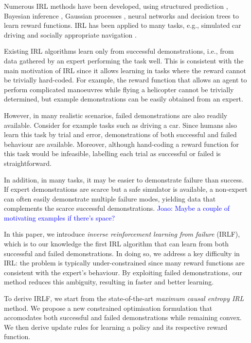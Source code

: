 \documentclass[letterpaper]{article}
\newcommand{\jm}[1]{\textcolor{blue}{Joao: #1}}
\newcommand{\jm}[1]{}
\begin{document}
Numerous IRL methods have been developed, using structured prediction \cite{ratliff2006maximum}, Bayesian inference \cite{ramachandran2007bayesian}, Gaussian processes \cite{levine2011nonlinear}, neural networks and decision trees \cite{ratliff2007boosting} to learn reward functions. IRL has been applied to many tasks, e.g., simulated car driving \cite{abbeel2004apprenticeship} and socially appropriate navigation \cite{henry2010learning,vasquez2014inverse}. 

Existing IRL algorithms learn only from successful demonstrations, i.e., from data gathered by an expert performing the task well. This is consistent with the main motivation of IRL since it allows learning in tasks where the reward cannot be trivially hard-coded.  For example, the reward function that allows an agent to perform complicated manoeuvres while flying a helicopter cannot be trivially determined, but example demonstrations can be easily obtained from an expert.

However, in many realistic scenarios, failed demonstrations are also readily available.  Consider for example tasks such as driving a car.  Since humans also learn this task by trial and error, demonstrations of both successful and failed behaviour are available. Moreover, although hand-coding a reward function for this task would be infeasible, labelling each trial as successful or failed is straightforward.

In addition, in many tasks, it may be easier to demonstrate failure than success.  If expert demonstrations are scarce but a safe simulator is available, a non-expert can often easily demonstrate multiple failure modes, yielding data that complements the scarce successful demonstrations. \jm{Maybe a couple of motivating examples if there's space?}

In this paper, we introduce \emph{inverse reinforcement learning from failure} (IRLF), which is to our knowledge the first IRL algorithm that can learn from both successful and failed demonstrations. In doing so, we address a key difficulty in IRL: the problem is typically under-constrained since many reward functions are consistent with the expert's behaviour.  By exploiting failed demonstrations, our method reduces this ambiguity, resulting in faster and better learning.

To derive IRLF, we start from the state-of-the-art \emph{maximum causal entropy IRL} \cite{ziebart2008maximum,ziebart2010modelingthesis} method. We propose a new constrained optimisation formulation that accomodates both successful and failed demonstrations while remaining convex.  We then derive update rules for learning a policy and its respective reward function.
\end{document}
